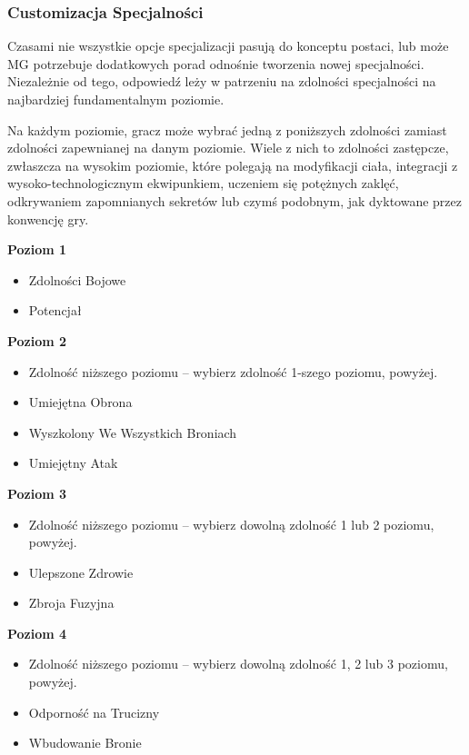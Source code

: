 \subsubsection{Customizacja Specjalności}

Czasami nie wszystkie opcje specjalizacji pasują do konceptu postaci, lub może MG potrzebuje dodatkowych porad odnośnie tworzenia nowej specjalności. Niezależnie od tego, odpowiedź leży w patrzeniu na zdolności specjalności na najbardziej fundamentalnym poziomie.

Na każdym poziomie, gracz może wybrać jedną z poniższych zdolności zamiast zdolności zapewnianej na danym poziomie. Wiele z nich to zdolności zastępcze, zwłaszcza na wysokim poziomie, które polegają na modyfikacji ciała, integracji z wysoko-technologicznym ekwipunkiem, uczeniem się potężnych zaklęć, odkrywaniem zapomnianych sekretów lub czymś podobnym, jak dyktowane przez konwencję gry.

\textbf{Poziom 1}

\begin{itemize}
\item Zdolności Bojowe
\item Potencjał
\end{itemize}

\textbf{Poziom 2}

\begin{itemize}
\item Zdolność niższego poziomu – wybierz zdolność 1-szego poziomu, powyżej.
\item Umiejętna Obrona
\item Wyszkolony We Wszystkich Broniach
\item Umiejętny Atak
\end{itemize}

\textbf{Poziom 3}

\begin{itemize}
\item Zdolność niższego poziomu – wybierz dowolną zdolność 1 lub 2 poziomu, powyżej.
\item Ulepszone Zdrowie
\item Zbroja Fuzyjna
\end{itemize}

\textbf{Poziom 4}

\begin{itemize}
\item Zdolność niższego poziomu – wybierz dowolną zdolność 1, 2 lub 3 poziomu, powyżej.
\item Odporność na Trucizny
\item Wbudowanie Bronie
\end{itemize}

